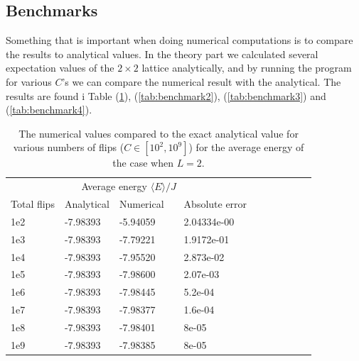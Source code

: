 \documentclass[norsk,a4paper,12pt]{article}
\begin{document}
\subsection{Benchmarks}
Something that is important when doing numerical computations is to compare the results to analytical values. In the theory part we calculated several expectation values of the $2\times2$ lattice analytically, and by running the program for various $C$'s we can compare the numerical result with the analytical. The results are found i Table (\ref{tab:benchmark1}), (\ref{tab:benchmark2}), (\ref{tab:benchmark3}) and (\ref{tab:benchmark4}).
\begin{table}[H]
\centering
\caption{The numerical values compared to the exact analytical value for various numbers of flips ($C\in[10^2,10^9]$) for the average energy of the case when $L=2$.}
\label{tab:benchmark1} 
\begin{tabularx}{\textwidth}{XlXrXrXrXrX}
&&&&\\
\toprule
\multicolumn{5}{c}{Average energy $\langle E\rangle/J$}\\
\cline{2-3}
Total flips  & Analytical  & Numerical && Absolute error\\
\midrule
1e2   & -7.98393  & -5.94059   && 2.04334e-00\\
1e3   & -7.98393  & -7.79221   && 1.9172e-01\\
1e4   & -7.98393  & -7.95520   && 2.873e-02\\
1e5   & -7.98393  & -7.98600   && 2.07e-03\\
1e6   & -7.98393  & -7.98445   && 5.2e-04\\
1e7 	  & -7.98393  & -7.98377   && 1.6e-04\\
1e8   & -7.98393  & -7.98401   && 8e-05\\
1e9   & -7.98393  & -7.98385   && 8e-05\\
\bottomrule
\end{tabularx}
\end{table}
\end{document}

